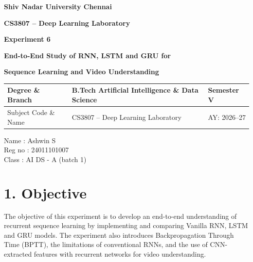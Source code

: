 \documentclass[10pt]{article}
\begin{document}

\begin{center}

{\large\textbf{Shiv Nadar University Chennai}}

\vspace{2mm}

{\normalsize\textbf{CS3807 -- Deep Learning Laboratory}}

\vspace{2mm}

{\large\textbf{Experiment 6}}

\vspace{1mm}

{\normalsize\textbf{End-to-End Study of RNN, LSTM and GRU for}}

{\normalsize\textbf{Sequence Learning and Video Understanding}}

\end{center}

\vspace{3mm}

\begin{tabular}{|p{3.4cm}|p{9.0cm}|p{1.4cm}|}
\hline
Degree \& Branch &
B.Tech Artificial Intelligence \& Data Science &
Semester V\\
\hline
Subject Code \& Name &
CS3807 -- Deep Learning Laboratory &
AY: 2026--27\\
\hline
\end{tabular}

\vspace{4mm}
Name : Ashwin S\\
Reg no : 24011101007\\
Class : AI DS - A (batch 1)\\

\section*{1. Objective}

The objective of this experiment is to develop an end-to-end understanding of
recurrent sequence learning by implementing and comparing Vanilla RNN, LSTM
and GRU models. The experiment also introduces Backpropagation Through Time
(BPTT), the limitations of conventional RNNs, and the use of CNN-extracted
features with recurrent networks for video understanding.
\end{document}
